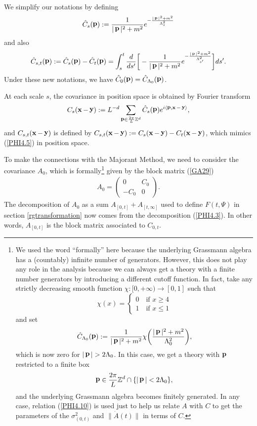 \documentclass[12pt,twoside]{amsart}
\numberwithin{equation}{section}
\DeclareMathOperator{\pp}{{\bf{p}}}
\DeclareMathOperator{\xx}{{\bf{x}}}
\DeclareMathOperator{\yy}{{\bf{y}}}
\newcommand{\enquote}[1]{``#1''}
\begin{document}
We simplify our notations by defining
\begin{eqnarray}
\hat{C}_{s}(\pp) := \frac{1}{|\pp|^{2}+m^{2}}e^{-\frac{|\pp|^{2}+m^{2}}{\Lambda_{s}^{2}}} \label{PHI4.4}
\end{eqnarray}
and also
\begin{eqnarray}
\hat{C}_{s,t}(\pp) := \hat{C}_{s}(\pp) - \hat{C}_{t}(\pp) = \int_{s}^{t}\frac{d}{ds'}\bigg{[}-\frac{1}{|\pp|^{2}+m^{2}}e^{-\frac{|\pp|^{2}+m^{2}}{\Lambda_{s'}^{2}}}\bigg{]}ds' . \label{PHI4.5}
\end{eqnarray}
Under these new notations, we have $\hat{C}_{0}(\pp) = \hat{C}_{\Lambda_{0}}(\pp)$. 

At each scale $s$, the covariance in position space is obtained by Fourier transform
\begin{eqnarray}
C_{s}(\xx-\yy) :=  L^{-d}\sum_{\pp \in \frac{2\pi}{L}\mathbb{Z}^{d}}\hat{C}_{s}(\pp)e^{i\langle \pp,\xx-\yy\rangle}, \label{PHI4.6}
\end{eqnarray}
and $C_{s,t}(\xx-\yy)$ is defined by $C_{s,t}(\xx-\yy) := C_{s}(\xx-\yy)-C_{t}(\xx-\yy)$, which mimics (\ref{PHI4.5}) in position space. 

To make the connections with the Majorant Method, we need to consider the covariance $A_{0}$, which is formally\footnote{We used the word \enquote{formally} here because the underlying Grassmann algebra has a (countably) infinite number of generators. However, this does not play any role in the analysis because we can always get a theory with a finite number generators by introducing a different cutoff function. In fact, take any strictly decreasing smooth function $\chi: [0,+\infty) \to [0,1]$ such that $$\chi(x) = \begin{cases} \displaystyle 0 \quad \mbox{if $x \ge 4$} \\ 1 \quad \mbox{if $x \le 1$} \end{cases}$$ and set $$\hat{C}_{\Lambda_{0}}(\pp) := \frac{1}{|\pp|^{2}+m^{2}}\chi\bigg{(}\frac{|\pp|^{2}+m^{2}}{\Lambda_{0}^{2}}\bigg{)},$$ which is now zero for $|\pp| > 2\Lambda_{0}$. In this case, we get a theory with $\pp$ restricted to a finite box $$ \pp \in \frac{2\pi}{L}\mathbb{Z}^{d} \cap \{|\pp| < 2\Lambda_{0}\},$$ and the underlying Grassmann algebra becomes finitely generated. In any case, relation (\ref{PHI4.10}) is used just to help us relate $A$ with $C$ to get the parameters of the $\sigma_{(0,t)}^{2}$ and $\|\dot{A}(t)\|$ in terms of $C$. } given by the block matrix (\ref{GA29})
\begin{eqnarray}
A_{0} = \begin{pmatrix}
0 & C_{0} \\
-C_{0} & 0 
\end{pmatrix}
.\label{PHI4.7}
\end{eqnarray}
The decomposition of $A_{0}$ as a sum $A_{[0,t]} + A_{[t,\infty]}$ used to define $F(t,\Psi)$ in section \ref{rgtransformation} now comes from the decomposition (\ref{PHI4.3}). In other words, $A_{[0,t]}$ is the block matrix associated to $C_{0,t}$. 
\end{document}
